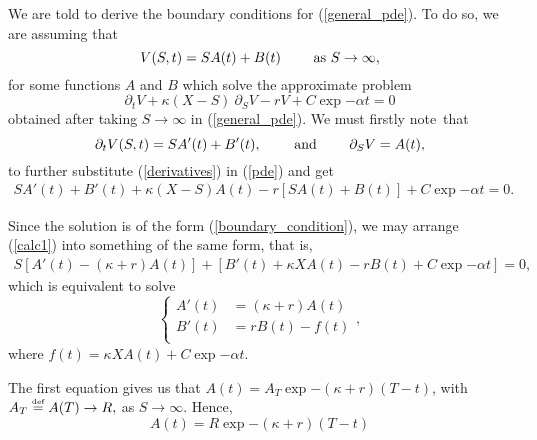 \noindent We are told to derive the boundary conditions for (\ref{general_pde}). To do so, we are assuming that 
	\begin{equation}\label{boundary_condition}
		V(S, t) = S A(t) + B(t) \quad\quad \text{ as } S\to \infty,
	\end{equation}
for some functions $A$ and $B$ which solve the approximate problem
	\begin{equation}\label{pde}
		\partial_t V + \kappa (X - S) \ \partial_S V - rV + C \exp{-\alpha t} = 0
	\end{equation}
obtained after taking $S\to\infty$ in (\ref{general_pde}). We must firstly note~that
	\begin{equation}\label{derivatives}
		\partial_t V (S, t) = S A'(t) + B'(t), \quad\quad \text{ and } \quad\quad \partial_S V = A(t),
	\end{equation}
to further substitute (\ref{derivatives}) in (\ref{pde}) and get
	\begin{equation}\label{calc1}
		\begin{aligned}
			S A'(t) + B'(t) + \kappa (X - S) A(t) - r \left[ S A(t) + B(t)\right] + C\exp{-\alpha t} = 0.
		\end{aligned}
	\end{equation}

Since the solution is of the form (\ref{boundary_condition}), we may arrange (\ref{calc1}) into something of the same form, that is,
	\begin{equation}\label{calc2}
		\begin{aligned}
			S \left[A'(t) - (\kappa + r) A(t) \right] + \left[ B'(t) + \kappa X A(t) - rB(t) + C\exp{-\alpha t}\right] = 0,
		\end{aligned}
	\end{equation}
which is equivalent to solve
	\begin{equation}
		\begin{cases}
			A'(t) &=  (\kappa + r) A(t) \\
			B'(t) &= rB(t)  - f(t) \\
		\end{cases},
	\end{equation}
where $f(t) = \kappa X A(t) + C\exp{-\alpha t}$.

The first equation gives us that $A(t) = A_T \exp{-(\kappa + r)(T-t)}$, with 
$
A_T \overset{\text{\tiny def}}{=} A(T) \to R,
$ 
as $S\to\infty$. Hence, 
\begin{equation}\label{A}
	A(t) = R\exp{-(\kappa + r)(T-t)}
\end{equation} 

